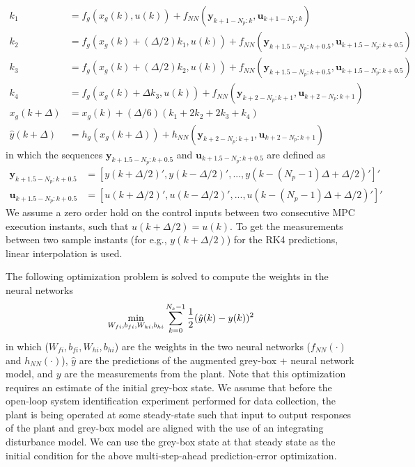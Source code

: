 \documentclass{article}
\begin{document}
\begin{align*}
  k_1 &= f_g(x_g(k), u(k)) + 
  f_{NN}(\mathbf{y}_{k+1-N_p:k}, \mathbf{u}_{k+1-N_p:k}) \\
  k_2 &= f_g(x_g(k) + (\Delta/2)k_1, u(k)) + 
  f_{NN}(\mathbf{y}_{k+1.5-N_p:k+0.5}, \mathbf{u}_{k+1.5-N_p:k+0.5})\\
  k_3 &= f_g(x_g(k) + (\Delta/2)k_2, u(k)) + 
  f_{NN}(\mathbf{y}_{k+1.5-N_p:k+0.5}, \mathbf{u}_{k+1.5-N_p:k+0.5})\\
  k_4 &= f_g(x_g(k) + \Delta k_3, u(k)) + 
  f_{NN}(\mathbf{y}_{k+2-N_p:k+1}, \mathbf{u}_{k+2-N_p:k+1})\\
  x_g(k+\Delta) &= x_g(k) + (\Delta/6)(k_1 + 2k_2 + 2k_3 + k_4) \\
  \hat{y}(k+\Delta) &= h_g(x_g(k+\Delta)) + 
  h_{NN}(\mathbf{y}_{k+2-N_p:k+1}, \mathbf{u}_{k+2-N_p:k+1})
\end{align*}
in which the sequences $\mathbf{y}_{k+1.5-N_p:k+0.5}$ 
and $\mathbf{u}_{k+1.5-N_p:k+0.5}$ are defined as 
\begin{align*}
  \mathbf{y}_{k+1.5-N_p:k+0.5} &= 
    [y(k + \Delta/2)', y(k-\Delta/2)', ..., y(k-(N_p-1)\Delta + \Delta/2)']' \\
    \mathbf{u}_{k+1.5-N_p:k+0.5} &= 
  [u(k + \Delta/2)', u(k-\Delta/2)', ..., u(k-(N_p-1)\Delta + \Delta/2)']' 
\end{align*}
We assume a zero order hold on the control inputs between two consecutive 
MPC execution instants, such that $u(k + \Delta/2) = u(k)$. To get the 
measurements between two sample instants (for e.g., $y(k + \Delta/2)$) for 
the RK4 predictions, linear interpolation is used.

The following optimization problem is solved to compute 
the weights in the neural networks 
\begin{align*}
 \underset{W_{fi}, b_{fi}, W_{hi}, b_{hi}}{\textnormal{min}} \sum_{k=0}^{N_s-1} 
 \dfrac{1}{2}(\hat{y}(k) - y(k))^2
\end{align*}
in which ($W_{fi}, b_{fi}, W_{hi}, b_{hi}$) are the weights in the 
two neural networks ($f_{NN}(\cdot)$ and $h_{NN}(\cdot)$), 
$\hat{y}$ are the predictions of the augmented
grey-box + neural network model, and $y$
are the measurements from the plant.
Note that this optimization requires an estimate 
of the initial grey-box state. We assume that 
before the open-loop system identification experiment 
performed for data collection, 
the plant is being operated at some 
steady-state such that input to output
responses of the plant and grey-box model are aligned with 
the use of an integrating disturbance model. We can use 
the grey-box state at that steady state as the initial condition 
for the above multi-step-ahead prediction-error
optimization.
\end{document}
